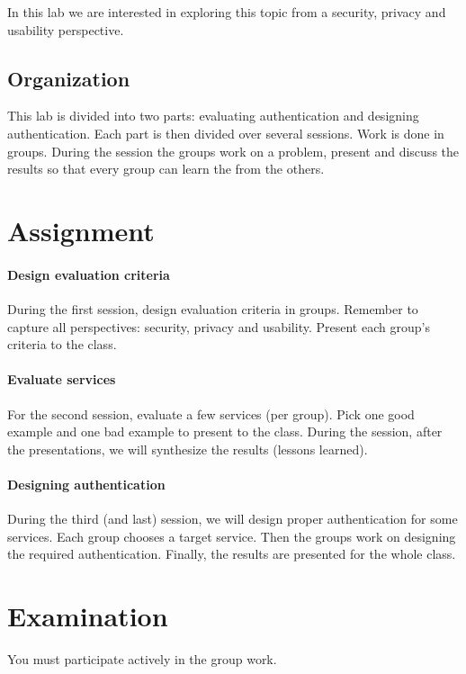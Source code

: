 In this lab we are interested in exploring this topic from a security, privacy 
and usability perspective.

\subsection{Organization}

This lab is divided into two parts: evaluating authentication and designing 
authentication.
Each part is then divided over several sessions.
Work is done in groups.
During the session the groups work on a problem, present and discuss the 
results so that every group can learn the from the others.


\section{Assignment}

\paragraph{Design evaluation criteria}

During the first session, design evaluation criteria in groups.
Remember to capture all perspectives: security, privacy and usability.
Present each group's criteria to the class.

\paragraph{Evaluate services}

For the second session, evaluate a few services (per group).
Pick one good example and one bad example to present to the class.
During the session, after the presentations, we will synthesize the results 
(lessons learned).

\paragraph{Designing authentication}

During the third (and last) session, we will design proper authentication for 
some services.
Each group chooses a target service.
Then the groups work on designing the required authentication.
Finally, the results are presented for the whole class.


\section{Examination}

You must participate actively in the group work.



\begin{frame}[allowframebreaks]
  \printbibliography
\end{frame}
